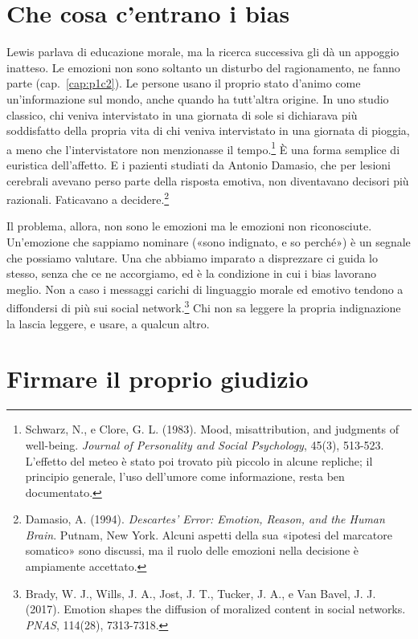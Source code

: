 \section{Che cosa c'entrano i bias}

Lewis parlava di educazione morale, ma la ricerca successiva gli dà un appoggio inatteso. Le emozioni non sono soltanto un disturbo del ragionamento, ne fanno parte (cap.~\ref{cap:p1c2}). Le persone usano il proprio stato d'animo come un'informazione sul mondo, anche quando ha tutt'altra origine. In uno studio classico, chi veniva intervistato in una giornata di sole si dichiarava più soddisfatto della propria vita di chi veniva intervistato in una giornata di pioggia, a meno che l'intervistatore non menzionasse il tempo.\footnote{Schwarz, N., e Clore, G. L. (1983). Mood, misattribution, and judgments of well-being. \textit{Journal of Personality and Social Psychology}, 45(3), 513-523. L'effetto del meteo è stato poi trovato più piccolo in alcune repliche; il principio generale, l'uso dell'umore come informazione, resta ben documentato.} È una forma semplice di euristica dell'affetto. E i pazienti studiati da Antonio Damasio, che per lesioni cerebrali avevano perso parte della risposta emotiva, non diventavano decisori più razionali. Faticavano a decidere.\footnote{Damasio, A. (1994). \textit{Descartes' Error: Emotion, Reason, and the Human Brain}. Putnam, New York. Alcuni aspetti della sua «ipotesi del marcatore somatico» sono discussi, ma il ruolo delle emozioni nella decisione è ampiamente accettato.}

Il problema, allora, non sono le emozioni ma le emozioni non riconosciute. Un'emozione che sappiamo nominare («sono indignato, e so perché») è un segnale che possiamo valutare. Una che abbiamo imparato a disprezzare ci guida lo stesso, senza che ce ne accorgiamo, ed è la condizione in cui i bias lavorano meglio. Non a caso i messaggi carichi di linguaggio morale ed emotivo tendono a diffondersi di più sui social network.\footnote{Brady, W. J., Wills, J. A., Jost, J. T., Tucker, J. A., e Van Bavel, J. J. (2017). Emotion shapes the diffusion of moralized content in social networks. \textit{PNAS}, 114(28), 7313-7318.} Chi non sa leggere la propria indignazione la lascia leggere, e usare, a qualcun altro.

\section{Firmare il proprio giudizio}

